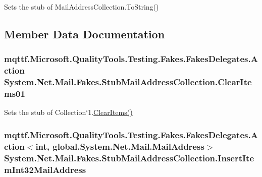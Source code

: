 Sets the stub of Mail\-Address\-Collection.\-To\-String()



\subsection{Member Data Documentation}
\hypertarget{class_system_1_1_net_1_1_mail_1_1_fakes_1_1_stub_mail_address_collection_ad5e2ac22278dbafcfa2fb6dd5e45eba0}{
\subsubsection[{Clear\-Items01}]{\setlength{\rightskip}{0pt plus 5cm}mqttf.\-Microsoft.\-Quality\-Tools.\-Testing.\-Fakes.\-Fakes\-Delegates.\-Action System.\-Net.\-Mail.\-Fakes.\-Stub\-Mail\-Address\-Collection.\-Clear\-Items01}}\label{class_system_1_1_net_1_1_mail_1_1_fakes_1_1_stub_mail_address_collection_ad5e2ac22278dbafcfa2fb6dd5e45eba0}


Sets the stub of Collection`1.\hyperlink{class_system_1_1_net_1_1_mail_1_1_fakes_1_1_stub_mail_address_collection_a3b0b325b989652f4c5ca9e7aa23e716f}{Clear\-Items()}

\hypertarget{class_system_1_1_net_1_1_mail_1_1_fakes_1_1_stub_mail_address_collection_a7514722d215a27d3bbe5ca1784062686}{
\subsubsection[{Insert\-Item\-Int32\-Mail\-Address}]{\setlength{\rightskip}{0pt plus 5cm}mqttf.\-Microsoft.\-Quality\-Tools.\-Testing.\-Fakes.\-Fakes\-Delegates.\-Action$<$int, global.\-System.\-Net.\-Mail.\-Mail\-Address$>$ System.\-Net.\-Mail.\-Fakes.\-Stub\-Mail\-Address\-Collection.\-Insert\-Item\-Int32\-Mail\-Address}}\label{class_system_1_1_net_1_1_mail_1_1_fakes_1_1_stub_mail_address_collection_a7514722d215a27d3bbe5ca1784062686}


